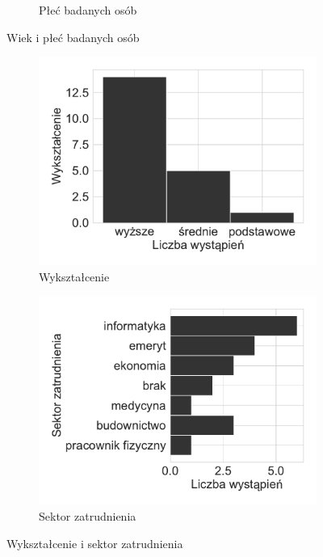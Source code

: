 \documentclass{./assets/wfis}
\begin{document}
\begin{figure}[h!]
\begin{subfigure}[b]{0.45\textwidth}
    \caption{Płeć badanych osób}
    \label{fig:gender}
\end{subfigure}
\caption{Wiek i płeć badanych osób}
\end{figure}

\begin{figure}[h!]
\begin{subfigure}[b]{0.45\textwidth}
    \centering
    \includegraphics[width=\columnwidth]{plots/education.pdf}
    \caption{Wykształcenie}
    \label{fig:education}
\end{subfigure}   
\hfill
\begin{subfigure}[b]{0.45\textwidth}
    \centering
    \includegraphics[width=\columnwidth]{plots/job.pdf}
    \caption{Sektor zatrudnienia}
    \label{fig:jobs}
\end{subfigure}
\caption{Wykształcenie i sektor zatrudnienia}
\end{figure}
\end{document}
